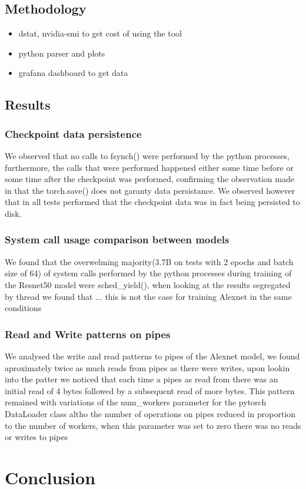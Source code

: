 \documentclass[conference]{IEEEtran}
\begin{document}
\subsection{Methodology}

\begin{itemize}
    \item dstat, nvidia-smi to get cost of using the tool
    \item python parser and plots
    \item grafana dashboard to get data 
\end{itemize}



\subsection{Results}

\subsubsection{Checkpoint data persistence}
We observed that no calls to fsynch() were performed by the python processes, furthermore, the calls that were performed happened either some time before or some time after the checkpoint was performed, confirming the observation made in \cite{checkfreq} that the torch.save() does not garanty data persistance.
We observed however that in all tests performed that the checkpoint data was in fact being persisted to disk.

\subsubsection{System call usage comparison between models}
We found that the overwelming majority(3.7B on tests with 2 epochs and batch size of 64) of system calls performed by the python processes during training of the Resnet50 model were sched\_yield(), when looking at the results segregated by thread we found that ... this is not the case for training Alexnet in the same conditions

\subsubsection{Read and Write patterns on pipes}
We analysed the write and read patterns to pipes of the Alexnet model, we found aproximately twice as much reads from pipes as there were writes, upon lookin into the patter we noticed that each time a pipes as read from there was an initial read of 4 bytes followed by a subsequent read of more bytes.
This pattern remained with variations of the num\_workers parameter for the pytorch DataLoader class altho the number of operations on pipes reduced in proportion to the number of workers, when this parameter was set to zero there was no reads or writes to pipes


\section{Conclusion}


\end{document}
